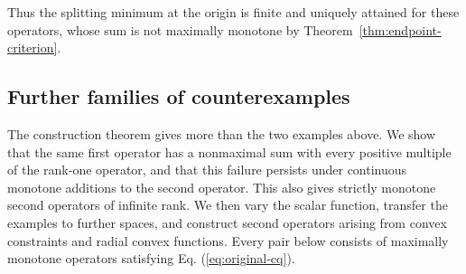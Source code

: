 \documentclass[11pt]{article}
\theoremstyle{definition}
\theoremstyle{remark}
\begin{document}
Thus the splitting minimum at the origin is finite and uniquely attained for these operators, whose sum is not maximally monotone by Theorem~\ref{thm:endpoint-criterion}.

\subsection{Further families of counterexamples}
\label{subsec:counterexample-families}
The construction theorem gives more than the two examples above. We show that the same first operator has a nonmaximal sum with every positive multiple of the rank-one operator, and that this failure persists under continuous monotone additions to the second operator. This also gives strictly monotone second operators of infinite rank. We then vary the scalar function, transfer the examples to further spaces, and construct second operators arising from convex constraints and radial convex functions. Every pair below consists of maximally monotone operators satisfying Eq. (\ref{eq:original-cq}).
\end{document}
